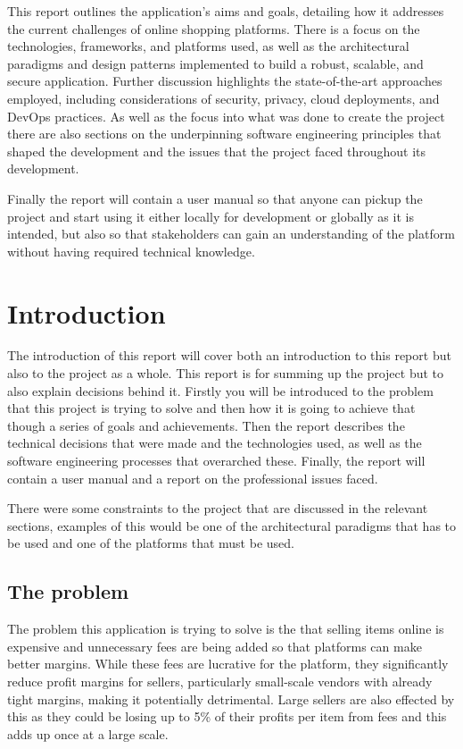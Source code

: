 \documentclass[]{project_report}
\begin{document}
This report outlines the application's aims and goals, detailing how it addresses the current challenges of online shopping platforms. There is a focus on the technologies, frameworks, and platforms used, as well as the architectural paradigms and design patterns implemented to build a robust, scalable, and secure application. Further discussion highlights the state-of-the-art approaches employed, including considerations of security, privacy, cloud deployments, and DevOps practices. As well as the focus into what was done to create the project there are also sections on the underpinning software engineering principles that shaped the development and the issues that the project faced throughout its development. 

Finally the report will contain a user manual so that anyone can pickup the project and start using it either locally for development or globally as it is intended, but also so that stakeholders can gain an understanding of the platform without having required technical knowledge.

\chapter{Introduction}

The introduction of this report will cover both an introduction to this report but also to the project as a whole. This report is for summing up the project but to also explain decisions behind it. Firstly you will be introduced to the problem that this project is trying to solve and then how it is going to achieve that though a series of goals and achievements. Then the report describes the technical decisions that were made and the technologies used, as well as the software engineering processes that overarched these. Finally, the report will contain a user manual and a report on the professional issues faced.

There were some constraints to the project that are discussed in the relevant sections, examples of this would be one of the architectural paradigms that has to be used and one of the platforms that must be used.


\section{The problem}

The problem this application is trying to solve is the that selling items online is expensive and unnecessary fees are being added so that platforms can make better margins. While these fees are lucrative for the platform, they significantly reduce profit margins for sellers, particularly small-scale vendors with already tight margins, making it potentially detrimental. Large sellers are also effected by this as they could be losing up to 5\% of their profits per item from fees and this adds up once at a large scale.
\end{document}
